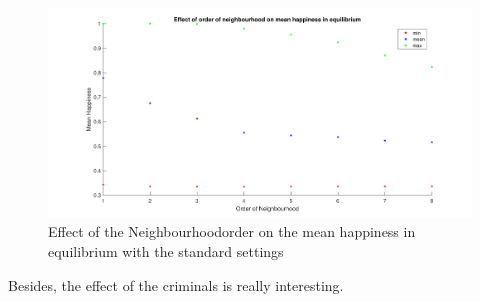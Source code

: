 \begin{figure}[H]
	\centering
    \includegraphics[width=\textwidth]{buurtorde-gemeindhappiness.pdf}
    \caption{Effect of the Neighbourhoodorder on the mean happiness in equilibrium with the standard settings}
    \label{fig:nbho-happiness}
\end{figure}

Besides, the effect of the criminals is really interesting.





